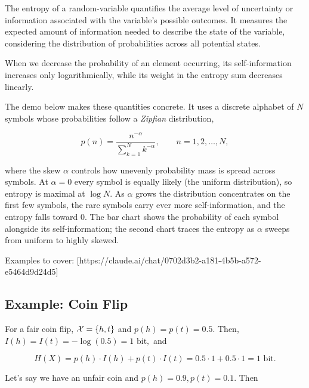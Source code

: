 \documentclass{article}
\begin{document}
\detach

\begin{remark}
The \@{entropy} of a \@{random-variable} quantifies the average level of uncertainty or information associated with the variable's possible outcomes. It measures the expected amount of information needed to describe the state of the variable, considering the distribution of probabilities across all potential states.
\end{remark}

\detach

\begin{note}
When we decrease the probability of an \@{element} occurring, its \@{self-information} increases only logarithmically, while its weight in the entropy sum decreases linearly.
\end{note}

The demo below makes these quantities concrete. It uses a discrete alphabet of $N$ symbols whose probabilities follow a \emph{Zipfian} distribution,

\[ p(n) = \frac{n^{-\alpha}}{\sum_{k=1}^{N} k^{-\alpha}}, \qquad n = 1, 2, \dots, N, \]

where the skew $\alpha$ controls how unevenly probability mass is spread across symbols. At $\alpha = 0$ every symbol is equally likely (the uniform distribution), so \@{entropy} is maximal at $\log N.$ As $\alpha$ grows the distribution concentrates on the first few symbols, the rare symbols carry ever more \@{self-information}, and the \@{entropy} falls toward $0.$ The bar chart shows the probability of each symbol alongside its \@{self-information}; the second chart traces the \@{entropy} as $\alpha$ sweeps from uniform to highly skewed.


Examples to cover: [https://claude.ai/chat/0702d3b2-a181-4b5b-a572-e5464d9d24d5]

\subsection{Example: Coin Flip}

For a fair coin flip, $\mathcal{X} = \left\{ h, t \right\}$ and $p(h) = p(t) = 0.5.$ Then, $I(h) = I(t) = - \log{(0.5)} = 1 \text{ bit},$ and

\[ H(X) = p(h) \cdot I(h) + p(t) \cdot I(t) = 0.5 \cdot 1 + 0.5 \cdot 1 = 1 \text{ bit}. \]

Let's say we have an unfair coin and $p(h) = 0.9, p(t) = 0.1.$ Then
\end{document}
